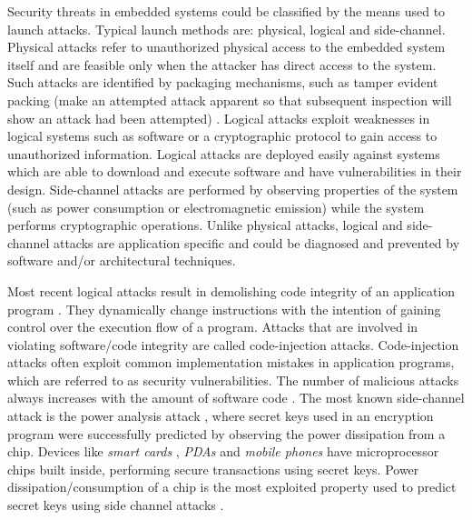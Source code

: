 \documentclass{article}
\begin{document}
Security threats in embedded systems could be classified by the means
used to launch attacks. Typical launch methods are: physical, logical
and side-channel. Physical attacks  refer  to  unauthorized  physical
access to the embedded system itself and are feasible   only when the
attacker has direct access to the system. Such attacks are identified
by  packaging  mechanisms,  such  as  tamper evident packing (make an
attempted attack apparent so that subsequent inspection will  show an
attack had been attempted) \cite{weingart00physical}. Logical attacks
exploit  weaknesses  in   logical   systems such as software   or   a
cryptographic  protocol  to  gain access to unauthorized information.
Logical  attacks are deployed easily  against  systems which are able
to download and  execute  software and have  vulnerabilities in their
design. Side-channel  attacks   are performed by observing properties
of the system (such as power consumption or electromagnetic emission)
while  the  system performs cryptographic operations. Unlike physical
attacks, logical and side-channel attacks  are  application  specific
and could be diagnosed and prevented by software and/or architectural
techniques.

Most  recent      logical attacks result in demolishing code
integrity of an application program \cite{milenkovic05hardware}. They
dynamically change instructions with the intention of gaining control
over the execution flow of a program.  Attacks  that  are involved in
violating software/code integrity are called  code-injection attacks.
Code-injection attacks often exploit common  implementation  mistakes
in  application programs,  which  are  referred to as        security
vulnerabilities.
The number of malicious attacks always increases  with  the amount of
software code \cite{cert07vulnerability}. The most
known side-channel attack is the power analysis attack
\cite{kocher99differential}, where   secret  keys used
in an encryption program were successfully predicted by observing the
power   dissipation      from a chip. Devices like \emph{smart cards}
\cite{biham99AESattack,chaumette}, \emph{PDAs} \cite{gebotys03ECCdummy}
and \emph{mobile phones} \cite{wolf05MultProc} have    microprocessor
chips built inside, performing secure transactions using secret keys.
Power dissipation/consumption  of  a   chip     is the most exploited
property used to predict  secret  keys  using    side channel attacks
\cite{koeune05ParallelComputing, zhou05side}.
\end{document}
